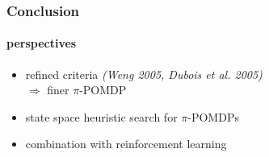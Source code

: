 \documentclass[12pt,svgnames,table]{beamer}
\begin{document}
\begin{frame}
\frametitle{Conclusion}
\framesubtitle{\footnotesize perspectives}

\begin{exampleblock}{}
\begin{itemize}
\item refined criteria {\footnotesize \textit{(Weng 2005, Dubois et al. 2005)}}\\ 
\hspace{2cm} $\Rightarrow$ finer $\pi$-POMDP
\item state space heuristic search for $\pi$-POMDPs
\item combination with reinforcement learning
\end{itemize}
\end{exampleblock}

\end{frame}
\end{document}
